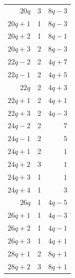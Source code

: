 \begin{longtable}{rrr}
$20q$ & 3 & $8q-3$\\
$20q+1$ & 1 & $8q-3$\\
$20q+2$ & 1 & $8q-1$\\
$20q+3$ & 2 & $8q-3$\\
$22q-2$ & 2 & $4q+7$\\
$22q-1$ & 2 & $4q+5$\\
$22q$ & 2 & $4q+3$\\
$22q+1$ & 2 & $4q+1$\\
$22q+3$ & 2 & $4q-3$\\
$24q-2$ & 2 & $7$\\
$24q-1$ & 2 & $5$\\
$24q+1$ & 2 & $1$\\
$24q+2$ & 3 & $1$\\
$24q+3$ & 1 & $1$\\
$24q+4$ & 1 & $3$\\
$26q$ & 1 & $4q-5$\\
$26q+1$ & 1 & $4q-3$\\
$26q+2$ & 1 & $4q-1$\\
$26q+3$ & 1 & $4q+1$\\
$28q+1$ & 2 & $8q+1$\\
$28q+2$ & 3 & $8q+1$\\
\end{longtable}
\endgroup

